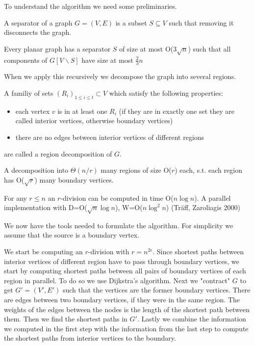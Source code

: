 To understand the algorithm we need some preliminaries.

\begin{Def} A separator of a graph $G=(V,E)$ is a subset $S\subseteq V$ such that removing it disconnects the graph.\end{Def}

\begin{thm} Every planar graph has a separator $S$ of size at most O($3\sqrt n$) such that all components of $G[V\backslash S]$ have size at most $\frac 23 n$\end{thm}

When we apply this recursively we decompose the graph into several regions.

\begin{Def} A familiy of sets $(R_i)_{1\leq i\leq t} \subset V$ which satisfy the following properties:

\begin{itemize}
\item each vertex $v$ is in at least one $R_i$ (if they are in exactly one set they are called interior vertices, otherwise boundary vertices)
\item there are no edges between interior vertices of different regions
\end{itemize}

are called a region decomposition of $G$.
\end{Def}

\begin{Def}[r-division] A decomposition into $\Theta(n/r)$ many regions of size O($r$) each, s.t. each region has O($\sqrt{r}$) many boundary vertices.
\end{Def}

\begin{thm}[Frederickson 1987] For any $r\leq n$ an $r$-division can be computed in time O($n\log n$). A parallel implementation with D=O($\sqrt n \log n$), W=O($n\log ^2n$) (Träff, Zaroliagis 2000) \end{thm} 

We now have the tools needed to formulate the algorithm. For simplicity we assume that the source is a boundary vertex.

We start be computing an $r$-division with $r=n^{2\epsilon}$. Since shortest paths between interior vertices of different region have to pass through boundary vertices, we start by computing shortest paths between all pairs of boundary vertices of each region in parallel. To do so we use Dijkstra's algorithm. Next we "contract" $G$ to get $G'=(V',E')$ such that the vertices are the former boundary vertices. There are edges between two boundary vertices, if they were in the same region. The weights of the edges between the nodes is the length of the shortest path between them. Then we find the shortest paths in $G'$. Lastly we combine the information we computed in the first step with the information from the last step to compute the shortest paths from interior vertices to the boundary.

